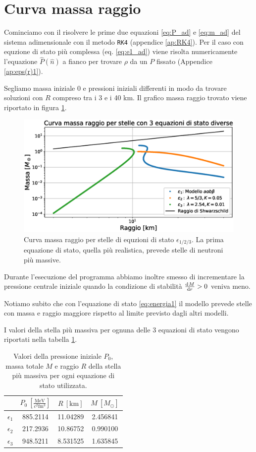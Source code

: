 \documentclass[a4paper, titlepage]{article}
\newcommand{\Punit}[0]{\frac{\unit{\mega\electronvolt}}{c^2 \unit{\femto\cubic\meter}}}
\begin{document}
\section{Curva massa raggio}
Cominciamo con il risolvere le prime due equazioni \ref{eq:P_ad} e \ref{eq:m_ad}
del sistema adimensionale con il metodo \texttt{RK4} (appendice \ref{ap:RK4}).
Per il caso con equzione di stato più complessa (eq. \ref{eq:e1_ad}) viene
risolta numericamente l'equazione $\hat P(\hat n)$ a fianco per trovare $\rho$
da un $P$ fissato (Appendice \ref{ap:eps(r)1}).

Segliamo massa iniziale 0 e pressioni iniziali differenti in modo da trovare
soluzioni con $R$ compreso tra i 3 e i 40 \unit{\kilo\meter}.
Il grafico massa raggio trovato viene riportato in figura \ref{fig:MR}.

\begin{figure}[h]
        \centering
        \includegraphics[width = 0.7 \textwidth]{Figures/MR.eps}
        \caption{Curva massa raggio per stelle di equzioni di stato
        $\epsilon_{1/2/3}$.
        La prima equazione di stato, quella più realistica,
        prevede stelle di neutroni più massive.}
        \label{fig:MR}
\end{figure}

Durante l'esecuzione del programma abbiamo inoltre smesso di incrementare la
pressione centrale iniziale quando la condizione di stabilità $\dv[]{M}{r} > 0$
veniva meno.

Notiamo subito che con l'equazione di stato \ref{eq:energia1} il modello prevede
stelle con massa e raggio maggiore rispetto al limite previsto dagli altri
modelli.

I valori della stella più massiva per ognuna delle 3 equazioni di stato vengono
riportati nella tabella \ref{tab:Mgrosso}.

\begin{table}[h!]
    \centering
    \begin{tabular}{c|c|c|c}
        & $P_0~[\Punit]$ & $R~[\unit{\kilo\meter}]$ & $M~[M_\odot]$ \\
         \hline
         $\epsilon_1$ & 885.2114 & 11.04289 & 2.456841 \\
         \hline
         $\epsilon_2$ & 217.2936 & 10.86752 & 0.990100 \\
         \hline
         $\epsilon_3$ & 948.5211 & 8.531525 & 1.635845 \\
    \end{tabular}
    \caption{Valori della pressione iniziale $P_0$, massa totale $M$ e raggio
    $R$ della stella più massiva per ogni equazione di stato utilizzata.}
    \label{tab:Mgrosso}
\end{table}
\end{document}
